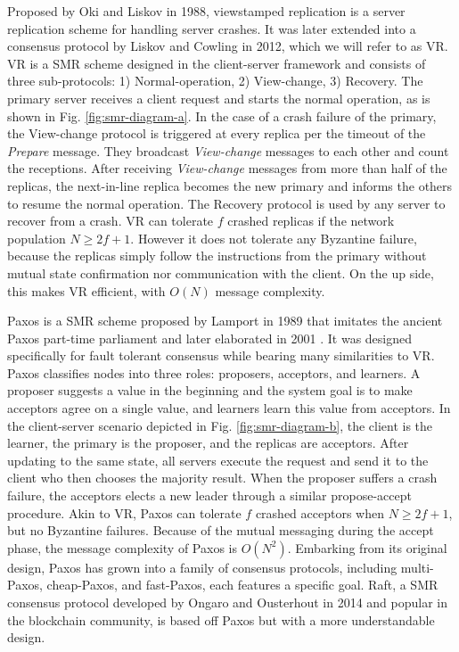 Proposed by Oki and Liskov  in 1988, viewstamped replication is a server replication scheme for handling server crashes. It was later extended into a consensus protocol by Liskov and Cowling  in 2012, which we will refer to as VR. VR is a SMR scheme designed in the client-server framework and consists of three sub-protocols: 1) Normal-operation, 2) View-change, 3) Recovery. The primary server receives a client request and starts the normal operation, as is shown in Fig. \ref{fig:smr-diagram-a}.
In the case of a crash failure of the primary, the View-change protocol is triggered at every replica per the timeout of the \emph{Prepare} message. They broadcast \emph{View-change} messages to each other and count the receptions. After receiving \emph{View-change} messages from more than half of the replicas, the next-in-line replica becomes the new primary and informs the others to resume the normal operation. The Recovery protocol is used by any server to recover from a crash. 
VR can tolerate $f$ crashed replicas if the network population $N\geq2f+1$. However it does not tolerate any Byzantine failure, because the replicas simply follow the instructions from the primary without mutual state confirmation nor communication with the client. On the up side, this makes VR efficient, with $O(N)$ message complexity.

Paxos is a SMR scheme proposed by Lamport  in 1989 that imitates the ancient Paxos part-time parliament and later elaborated in 2001 . It was designed specifically for fault tolerant consensus while bearing many similarities to VR. Paxos classifies nodes into three roles: proposers, acceptors, and learners. A proposer suggests a value in the beginning and the system goal is to make acceptors agree on a single value, and learners learn this value from acceptors. In the client-server scenario depicted in Fig. \ref{fig:smr-diagram-b}, the client is the learner, the primary is the proposer, and the replicas are acceptors. After updating to the same state, all servers execute the request and send it to the client who then chooses the majority result.
When the proposer suffers a crash failure, the acceptors elects a new leader through a similar propose-accept procedure.
Akin to VR, Paxos can tolerate $f$ crashed acceptors when $N\geq2f+1$, but no Byzantine failures. Because of the mutual messaging during the accept phase, the message complexity of Paxos is $O(N^2)$. 
Embarking from its original design, Paxos has grown into a family of consensus protocols, including multi-Paxos, cheap-Paxos, and fast-Paxos, each features a specific goal. Raft, a SMR consensus protocol developed by Ongaro and Ousterhout  in 2014 and popular in the blockchain community, is based off Paxos but with a more understandable design.

